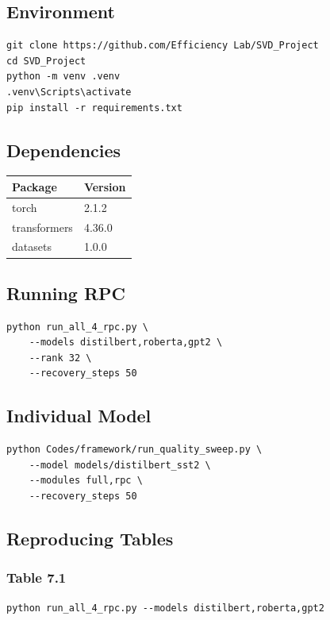 \subsection{Environment}

\begin{lstlisting}
git clone https://github.com/Efficiency Lab/SVD_Project
cd SVD_Project
python -m venv .venv
.venv\Scripts\activate
pip install -r requirements.txt
\end{lstlisting}

\subsection{Dependencies}

\begin{table}[H]
\centering
\small
\begin{tabular}{ll}
\toprule
\textbf{Package} & \textbf{Version} \\
\midrule
torch & 2.1.2 \\
transformers & 4.36.0 \\
datasets & 1.0.0 \\
\bottomrule
\end{tabular}
\end{table}

\subsection{Running RPC}

\begin{lstlisting}
python run_all_4_rpc.py \
    --models distilbert,roberta,gpt2 \
    --rank 32 \
    --recovery_steps 50
\end{lstlisting}

\subsection{Individual Model}

\begin{lstlisting}
python Codes/framework/run_quality_sweep.py \
    --model models/distilbert_sst2 \
    --modules full,rpc \
    --recovery_steps 50
\end{lstlisting}

\subsection{Reproducing Tables}

\subsubsection{Table 7.1}
\begin{lstlisting}
python run_all_4_rpc.py --models distilbert,roberta,gpt2
\end{lstlisting}


